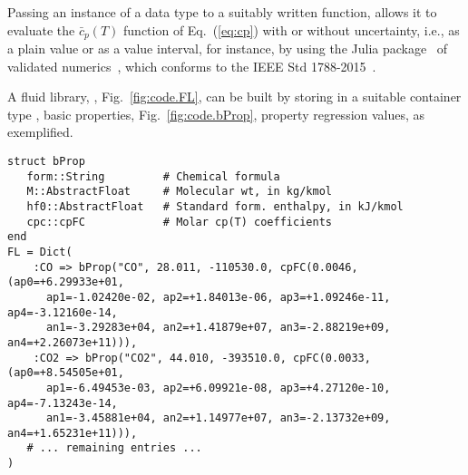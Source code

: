     Passing an instance of a  data type to a suitably written function, allows it to evaluate the $\bar{c}_p(T)$ function of Eq.~(\ref{eq:cp}) with or without uncertainty, i.e.,  as
    a plain value or as a value interval, for instance, by  using  the    Julia  package~\cite{2020-BenetL+SandersDP-IntervalArithmetic.jl}  of  validated
    numerics~\cite{2011-TuckerW-Princeton-Validated, 2009-MooreR-SIAM-Introduction}, which conforms to the IEEE Std 1788-2015~\cite{2015-RevolN+ThompsonT-IEEE-IA}.

    A fluid library, , Fig.~\ref{fig:code.FL}, can be built by storing in a suitable container type ,  basic  properties,  Fig.~\ref{fig:code.bProp},  property  regression
    values, as exemplified.

    \begin{figure*}[h]
        \centering
        \begin{lstlisting}
struct bProp
   form::String         # Chemical formula
   M::AbstractFloat     # Molecular wt, in kg/kmol
   hf0::AbstractFloat   # Standard form. enthalpy, in kJ/kmol
   cpc::cpFC            # Molar cp(T) coefficients
end
FL = Dict(
    :CO => bProp("CO", 28.011, -110530.0, cpFC(0.0046,     (ap0=+6.29933e+01,
      ap1=-1.02420e-02, ap2=+1.84013e-06, ap3=+1.09246e-11, ap4=-3.12160e-14,
      an1=-3.29283e+04, an2=+1.41879e+07, an3=-2.88219e+09, an4=+2.26073e+11))),
    :CO2 => bProp("CO2", 44.010, -393510.0, cpFC(0.0033,   (ap0=+8.54505e+01,
      ap1=-6.49453e-03, ap2=+6.09921e-08, ap3=+4.27120e-10, ap4=-7.13243e-14,
      an1=-3.45881e+04, an2=+1.14977e+07, an3=-2.13732e+09, an4=+1.65231e+11))),
   # ... remaining entries ...
)
        \end{lstlisting}
        \caption{Listing for the  basic property container for reactive ideal gas and  fluid library code  snippet.    data  members  include  the  substance's
            molecular  ``weight'',  ,  formation  enthalpy,  ,  and  the    structure  listed  on  Fig.~\ref{fig:code.cpFC}.      fluid   library   is   a
             instance, in which disctionary keys are s and values are of  type. The illustrated coefficients for the  and  were
            obtained    by    curve-fitting    into     Eq.~(\ref{eq:cp})     low-pressure     $\bar{c}_p$     values     obtained     with     the     CoolProp     thermophysical     property
            library~\cite{2014-BellIH+VincentL-IndEngChemR}.}
        \label{fig:code.bProp}
    \end{figure*}

